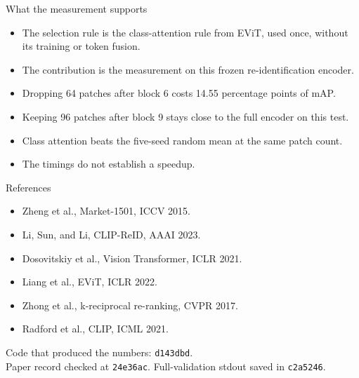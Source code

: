 \documentclass[aspectratio=169,11pt]{beamer}
\begin{document}
\begin{frame}{What the measurement supports}
\begin{itemize}
\item The selection rule is the class-attention rule from EViT, used once, without its training or token fusion.
\item The contribution is the measurement on this frozen re-identification encoder.
\item Dropping 64 patches after block 6 costs 14.55 percentage points of mAP.
\item Keeping 96 patches after block 9 stays close to the full encoder on this test.
\item Class attention beats the five-seed random mean at the same patch count.
\item The timings do not establish a speedup.
\end{itemize}
\end{frame}

\begin{frame}{References}
\begin{itemize}
\item Zheng et al., Market-1501, ICCV 2015.
\item Li, Sun, and Li, CLIP-ReID, AAAI 2023.
\item Dosovitskiy et al., Vision Transformer, ICLR 2021.
\item Liang et al., EViT, ICLR 2022.
\item Zhong et al., k-reciprocal re-ranking, CVPR 2017.
\item Radford et al., CLIP, ICML 2021.
\end{itemize}
\vspace{0.6em}
\footnotesize
Code that produced the numbers: \texttt{d143dbd}.\\
Paper record checked at \texttt{24e36ac}. Full-validation stdout saved in \texttt{c2a5246}.
\end{frame}
\end{document}
